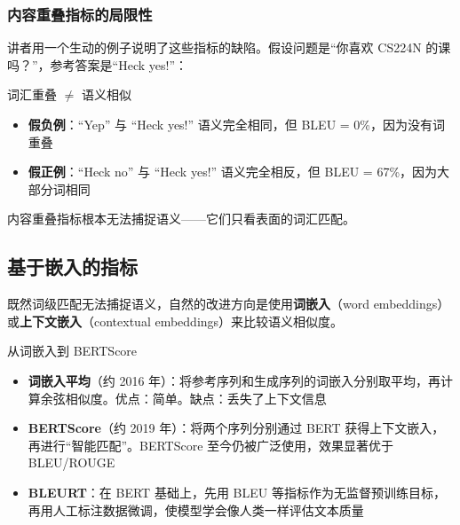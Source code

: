 \documentclass[a4paper]{article}
\begin{document}



\subsubsection{内容重叠指标的局限性}

讲者用一个生动的例子说明了这些指标的缺陷。假设问题是``你喜欢 CS224N 的课吗？''，参考答案是``Heck yes!''：





\begin{warningbox}{词汇重叠 $\neq$ 语义相似}
\begin{itemize}
    \item \textbf{假负例}：``Yep'' 与 ``Heck yes!'' 语义完全相同，但 BLEU = 0\%，因为没有词重叠
    \item \textbf{假正例}：``Heck no'' 与 ``Heck yes!'' 语义完全相反，但 BLEU = 67\%，因为大部分词相同
\end{itemize}
内容重叠指标根本无法捕捉语义——它们只看表面的词汇匹配。
\end{warningbox}

\subsection{基于嵌入的指标}

既然词级匹配无法捕捉语义，自然的改进方向是使用\textbf{词嵌入}（word embeddings）或\textbf{上下文嵌入}（contextual embeddings）来比较语义相似度。





\begin{knowledgebox}{从词嵌入到 BERTScore}
\begin{itemize}
    \item \textbf{词嵌入平均}（约 2016 年）：将参考序列和生成序列的词嵌入分别取平均，再计算余弦相似度。优点：简单。缺点：丢失了上下文信息
    \item \textbf{BERTScore}（约 2019 年）：将两个序列分别通过 BERT 获得上下文嵌入，再进行``智能匹配''。BERTScore 至今仍被广泛使用，效果显著优于 BLEU/ROUGE
    \item \textbf{BLEURT}：在 BERT 基础上，先用 BLEU 等指标作为无监督预训练目标，再用人工标注数据微调，使模型学会像人类一样评估文本质量
\end{itemize}
\end{knowledgebox}
\end{document}

